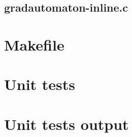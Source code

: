 \begin{scriptsize}
\begin{ttfamily}

\end{ttfamily}
\end{scriptsize}

\subsection{gradautomaton-inline.c}

\begin{scriptsize}
\begin{ttfamily}

\end{ttfamily}
\end{scriptsize}

\section{Makefile}

\begin{scriptsize}
\begin{ttfamily}

\end{ttfamily}
\end{scriptsize}

\section{Unit tests}

\begin{scriptsize}
\begin{ttfamily}

\end{ttfamily}
\end{scriptsize}

\section{Unit tests output}

\begin{scriptsize}
\begin{ttfamily}

\end{ttfamily}
\end{scriptsize}



